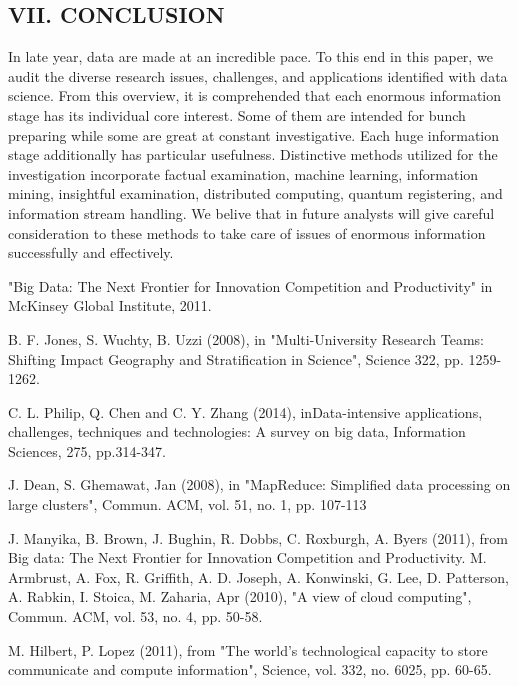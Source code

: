 \documentclass[a4paper]{article}
\begin{document}
\begin{multicols}{2}
\subsection*{VII. CONCLUSION}
In late year, data are made at an incredible pace. To this end in
this paper, we audit the diverse research issues, challenges, and
applications identified with data science. From this overview,
it is comprehended that each enormous information stage has
its individual core interest. Some of them are intended for
bunch preparing while some are great at constant investigative.
Each huge information stage additionally has particular
usefulness. Distinctive methods utilized for the investigation
incorporate factual examination, machine learning, information
mining, insightful examination, distributed computing,
quantum registering, and information stream handling. We
belive that in future analysts will give careful consideration to
these methods to take care of issues of enormous information
successfully and effectively.

\begin{thebibliography}{} 
\bibitem "Big Data: The Next Frontier for Innovation Competition and
Productivity" in McKinsey Global Institute, 2011.

\bibitem B. F. Jones, S. Wuchty, B. Uzzi (2008), in "Multi-University
Research Teams: Shifting Impact Geography and Stratification
in Science", Science 322, pp. 1259-1262.

\bibitem C. L. Philip, Q. Chen and C. Y. Zhang (2014), inData-intensive
applications, challenges, techniques and technologies: A survey 
on big data, Information Sciences, 275, pp.314-347.


\bibitem J. Dean, S. Ghemawat, Jan (2008), in "MapReduce: Simplified
data processing on large clusters", Commun. ACM, vol. 51, no.
1, pp. 107-113

\bibitem J. Manyika, B. Brown, J. Bughin, R. Dobbs, C. Roxburgh, A.
Byers (2011), from Big data: The Next Frontier for Innovation
Competition and Productivity.
\bibitem M. Armbrust, A. Fox, R. Griffith, A. D. Joseph, A. Konwinski,
G. Lee, D. Patterson, A. Rabkin, I. Stoica, M. Zaharia, Apr
(2010), "A view of cloud computing", Commun. ACM, vol. 53,
no. 4, pp. 50-58.

\bibitem M. Hilbert, P. Lopez (2011), from "The world’s technological
capacity to store communicate and compute information",
Science, vol. 332, no. 6025, pp. 60-65.


\end{thebibliography}
\end{multicols}
\end{document}
